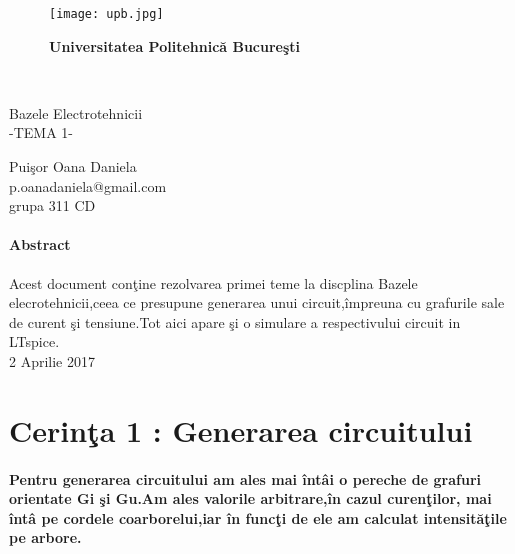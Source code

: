 \documentclass[12pt,twoside]{report}
\numberwithin{figure}{section}
\begin{document}
	\begin{titlepage}
		\begin{figure}
			\texttt{[image: upb.jpg]}
			\vspace{1cm}
			\begin{center}
			{\LARGE\bfseries Universitatea Politehnic\u{a} Bucure\c{s}ti}
			\end{center}

			
		\end{figure}
		\\		
		\begin{center}
		{\Huge Bazele Electrotehnicii \\}
		\vspace{1cm}
		{\Huge -TEMA 1-}\vfill
		
		
		
		{\Large Pui\c{s}or Oana Daniela}
		\\
		{\Large p.oanadaniela@gmail.com}
		\\
		{\Large grupa 311 CD}\vfill
		\paragraph{Abstract}{\large Acest document con\c{t}ine rezolvarea primei teme la discplina Bazele elecrotehnicii,ceea ce presupune generarea unui circuit,\^{i}mpreuna cu grafurile sale de curent \c{s}i tensiune.Tot aici apare \c{s}i o simulare a respectivului  circuit in LTspice.}
		\\
		
		
		{\Large 2 Aprilie 2017}
		
		
		\end{center}
	
		
	\end{titlepage}
	
	\newpage
	
	
	\tableofcontents
	
	
                                   
	

		\newpage
		\section{Cerin\c{t}a 1 : Generarea circuitului}
		
		\paragraph{ Pentru generarea circuitului am ales mai \^{i}nt\^{a}i o pereche de grafuri orientate Gi \c{s}i Gu.Am ales valorile arbitrare,\^{i}n cazul curen\c{t}ilor, mai \^int\^{a} pe cordele coarborelui,iar \^{i}n func\c{t}i de ele am calculat intensit\u{a}\c{t}ile pe arbore. }
		
\end{document}
